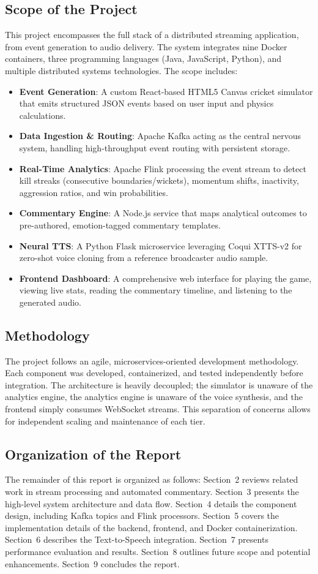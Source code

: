 \documentclass[12pt,a4paper]{article}
\begin{document}
\subsection{Scope of the Project}
This project encompasses the full stack of a distributed streaming application, from event generation to audio delivery. The system integrates nine Docker containers, three programming languages (Java, JavaScript, Python), and multiple distributed systems technologies. The scope includes:
\begin{itemize}
\item \textbf{Event Generation}: A custom React-based HTML5 Canvas cricket simulator that emits structured JSON events based on user input and physics calculations.
\item \textbf{Data Ingestion \& Routing}: Apache Kafka acting as the central nervous system, handling high-throughput event routing with persistent storage.
\item \textbf{Real-Time Analytics}: Apache Flink processing the event stream to detect kill streaks (consecutive boundaries/wickets), momentum shifts, inactivity, aggression ratios, and win probabilities.
\item \textbf{Commentary Engine}: A Node.js service that maps analytical outcomes to pre-authored, emotion-tagged commentary templates.
\item \textbf{Neural TTS}: A Python Flask microservice leveraging Coqui XTTS-v2 for zero-shot voice cloning from a reference broadcaster audio sample.
\item \textbf{Frontend Dashboard}: A comprehensive web interface for playing the game, viewing live stats, reading the commentary timeline, and listening to the generated audio.
\end{itemize}

\subsection{Methodology}
The project follows an agile, microservices-oriented development methodology. Each component was developed, containerized, and tested independently before integration. The architecture is heavily decoupled; the simulator is unaware of the analytics engine, the analytics engine is unaware of the voice synthesis, and the frontend simply consumes WebSocket streams. This separation of concerns allows for independent scaling and maintenance of each tier.

\subsection{Organization of the Report}
The remainder of this report is organized as follows: 
Section~2 reviews related work in stream processing and automated commentary. 
Section~3 presents the high-level system architecture and data flow. 
Section~4 details the component design, including Kafka topics and Flink processors. 
Section~5 covers the implementation details of the backend, frontend, and Docker containerization. 
Section~6 describes the Text-to-Speech integration. 
Section~7 presents performance evaluation and results. 
Section~8 outlines future scope and potential enhancements. 
Section~9 concludes the report.
\end{document}
